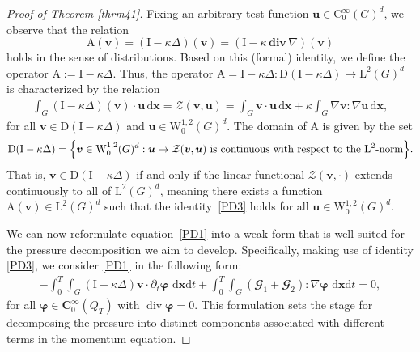 \documentclass[12pt,reqno]{amsart}
\numberwithin{equation}{section}
\let\originalleft\left
\let\originalright\right
\renewcommand{\left}{\mathopen{}\mathclose\bgroup\originalleft}
\renewcommand{\right}{\aftergroup\egroup\originalright}
\theoremstyle{definition}
\def\dxt{\,\mathrm{d}\boldsymbol{x}\mathrm{d}t}
\def\div{\operatorname{div}}
\def\divv{\mathbf{div}\,}
\def\I{\mathrm{I}}
\def\D{\mathrm{D}}
\def\W{\mathrm{W}}
\def\L{\mathrm{L}}
\def\uu{\boldsymbol{u}}  %
\def\vv{\boldsymbol{v}}
\def\C{\mathrm{C}}
\def\x{\boldsymbol{x}}
\def\bfC{\mathbf{C}}
\def\bfi{\boldsymbol{\varphi}}
\def\bcG{\mathbfcal{G}}
\begin{document}
\begin{proof}[Proof of Theorem \ref{thrm41}]
{Fixing an arbitrary test function $\uu \in \C_0^\infty(G)^d$, we observe that the relation
\begin{equation*}
\mathrm{A}(\vv) = (\I - \kappa \Delta)(\vv) = (\I - \kappa\, \divv \nabla)(\vv)
\end{equation*}
holds in the sense of distributions. Based on this (formal) identity, we define the operator $\mathrm{A} := \I - \kappa \Delta$. Thus, the operator $\mathrm{A} = \I - \kappa \Delta : \D(\I - \kappa \Delta) \to \L^2(G)^d$ is characterized by the relation
\begin{align} \label{PD3}
    \int_G (\I - \kappa \Delta)(\vv) \cdot \uu \, \mathrm{d}\x
    = \mathcal{Z}(\vv, \uu)
    = \int_G \vv \cdot \uu \, \mathrm{d}\x + \kappa \int_G \nabla \vv : \nabla \uu \, \mathrm{d}\x,
\end{align}
for all $\vv \in \D(\I - \kappa \Delta)$ and $\uu \in \W_0^{1,2}(G)^d$.
The domain of $\mathrm{A}$ is given by the set
\begin{align*}
    \D(\I - \kappa \Delta)
    = \left\{ \vv \in \W_0^{1,2}(G)^d : \uu \mapsto \mathcal{Z}(\vv, \uu) \text{ is continuous with respect to the } \L^2 \text{-norm} \right\}.
\end{align*}
That is, $\vv \in \D(\I - \kappa \Delta)$ if and only if the linear functional $\mathcal{Z}(\vv, \cdot)$ extends continuously to all of $ \L^2(G)^d$, meaning there exists a function $\mathrm{A}(\vv) \in \L^2(G)^d$ such that the identity~\eqref{PD3} holds for all $\uu \in \W_0^{1,2}(G)^d$.

We can now reformulate equation~\eqref{PD1} into a weak form that is well-suited for the pressure decomposition we aim to develop. Specifically, making use of identity \eqref{PD3}, we consider \eqref{PD1} in the following form:
\begin{equation} \label{PD4}
\begin{split}
   -\!\int_0^T \!\!\int_G (\I - \kappa \Delta)\vv \cdot \partial_t \bfi \, \dxt
   + \int_0^T \!\!\int_G (\bcG_1 + \bcG_2) : \nabla \bfi \, \dxt=0,
\end{split}
\end{equation}
for all $\bfi \in \bfC^\infty_0(Q_T)$ with $\div\bfi=0$.
This formulation sets the stage for decomposing the pressure into distinct components associated with different terms in the momentum equation.

}
\end{proof}
\end{document}

